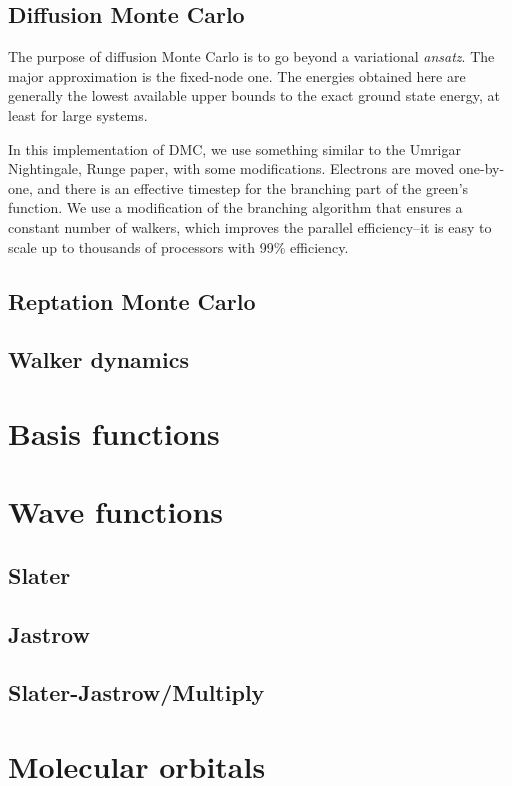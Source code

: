 \documentclass[12pt]{article}
\begin{document}
\newpage
\subsection{Diffusion Monte Carlo}
The purpose of diffusion Monte Carlo is to go beyond a variational 
\emph{ansatz}.  The major approximation is the fixed-node one.  
The energies obtained here are generally the lowest 
available upper bounds to the exact ground state energy, at least for 
large systems.  

In this implementation of DMC, we use something similar to the Umrigar
Nightingale, Runge paper, with some modifications.  Electrons are moved 
one-by-one, and there is an effective timestep for the branching part of 
the green's function.  We use a modification of the branching algorithm 
that ensures a constant number of walkers, which improves the 
parallel efficiency--it is easy to scale up to thousands of processors
with 99\% efficiency.


\subsection{Reptation Monte Carlo}
\subsection{Walker dynamics}


\section{Basis functions}

\section{Wave functions}
\subsection{Slater}
\subsection{Jastrow}
\subsection{Slater-Jastrow/Multiply}

\section{Molecular orbitals}
\end{document}
